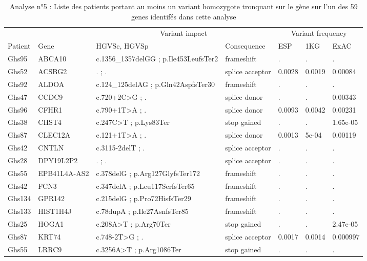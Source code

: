 \documentclass[12pt,twoside]{reedthesis}
\theoremstyle{definition}
\theoremstyle{definition}
\theoremstyle{remark}
\begin{document}
  \begin{landscape}
  \begin{longtable}[t]{lllllll}
  \caption{\label{tab:tabgrp4high}Analyse n°5 : Liste des patients portant au moins un variant homozygote tronquant sur le gène sur l'un des 59 genes identifés dans cette analyse}\\
  \toprule
  \multicolumn{1}{c}{ } & \multicolumn{1}{c}{ } & \multicolumn{2}{c}{Variant impact} & \multicolumn{3}{c}{Variant frequency} \\
  \cmidrule(l{2pt}r{2pt}){3-4} \cmidrule(l{2pt}r{2pt}){5-7}
  Patient & Gene & HGVSc, HGVSp & Consequence & ESP & 1KG & ExAC\\
  \midrule
  Ghs95 & ABCA10 & c.1356\_1357delGG ; p.Ile453LeufsTer2 & frameshift & . & . & .\\
  Ghs52 & ACSBG2 & . ; . & splice acceptor & 0.0028 & 0.0019 & 0.00084\\
  Ghs92 & ALDOA & c.124\_125delAG ; p.Gln42AspfsTer30 & frameshift & . & . & .\\
  Ghs47 & CCDC9 & c.720+2C>G ; . & splice donor & . & . & 0.00343\\
  Ghs96 & CFHR1 & c.790+1T>A ; . & splice donor & 0.0093 & 0.0042 & 0.00231\\
  \addlinespace
  Ghs38 & CHST4 & c.247C>T ; p.Lys83Ter & stop gained & . & . & 1.65e-05\\
  Ghs87 & CLEC12A & c.121+1T>A ; . & splice donor & 0.0013 & 5e-04 & 0.00119\\
  Ghs42 & CNTLN & c.3115-2delT ; . & splice acceptor & . & . & .\\
  Ghs28 & DPY19L2P2 & . ; . & splice acceptor & . & . & .\\
  Ghs55 & EPB41L4A-AS2 & c.378delG ; p.Arg127GlyfsTer172 & frameshift & . & . & .\\
  \addlinespace
  Ghs42 & FCN3 & c.347delA ; p.Leu117SerfsTer65 & frameshift & . & . & .\\
  Ghs134 & GPR142 & c.215delG ; p.Pro72HisfsTer29 & frameshift & . & . & .\\
  Ghs133 & HIST1H4J & c.78dupA ; p.Ile27AsnfsTer85 & frameshift & . & . & .\\
  Ghs25 & HOGA1 & c.208A>T ; p.Arg70Ter & stop gained & . & . & 2.47e-05\\
  Ghs87 & KRT74 & c.748-2T>G ; . & splice acceptor & 0.0017 & 0.0014 & 0.000997\\
  \addlinespace
  Ghs55 & LRRC9 & c.3256A>T ; p.Arg1086Ter & stop gained & . & . & .\\

\end{longtable}
\end{landscape}
\end{document}
